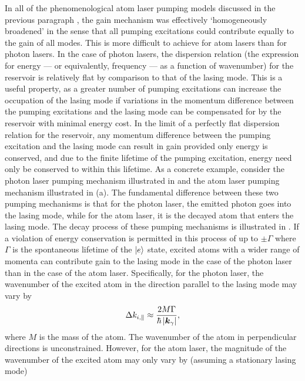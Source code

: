 In all of the phenomenological atom laser pumping models discussed in the previous paragraph \citep{Haine:2002kp,Kneer:1998fk,Robins:2001pd}, the gain mechanism was effectively `homogeneously broadened' in the sense that all pumping excitations could contribute equally to the gain of all modes.  This is more difficult to achieve for atom lasers than for photon lasers.  In the case of photon lasers, the dispersion relation (the expression for energy --- or equivalently, frequency --- as a function of wavenumber) for the reservoir is relatively flat by comparison to that of the lasing mode.  This is a useful property, as a greater number of pumping excitations can increase the occupation of the lasing mode if variations in the momentum difference between the pumping excitations and the lasing mode can be compensated for by the reservoir with minimal energy cost.  In the limit of a perfectly flat dispersion relation for the reservoir, any momentum difference between the pumping excitation and the lasing mode can result in gain provided only energy is conserved, and due to the finite lifetime of the pumping excitation, energy need only be conserved to within this lifetime.  As a concrete example, consider the photon laser pumping mechanism illustrated in  and the atom laser pumping mechanism illustrated in (a).  The fundamental difference between these two pumping mechanisms is that for the photon laser, the emitted photon goes into the lasing mode, while for the atom laser, it is the decayed atom that enters the lasing mode.  The decay process of these pumping mechanisms is illustrated in .  If a violation of energy conservation is permitted in this process of up to $\pm \Gamma$ where $\Gamma$ is the spontaneous lifetime of the ${\left|e\right>}$ state, excited atoms with a wider range of momenta can contribute gain to the lasing mode in the case of the photon laser than in the case of the atom laser.  Specifically, for the photon laser, the wavenumber of the excited atom in the direction parallel to the lasing mode may vary by
\begin{align*}
    \Delta k_{i,\parallel} \approx \frac{2 M \Gamma}{\hbar \left|\bm{k}_\gamma\right|},
\end{align*}
where $M$ is the mass of the atom.  The wavenumber of the atom in perpendicular directions is unconstrained.  However, for the atom laser, the magnitude of the wavenumber of the excited atom may only vary by (assuming a stationary lasing mode)
